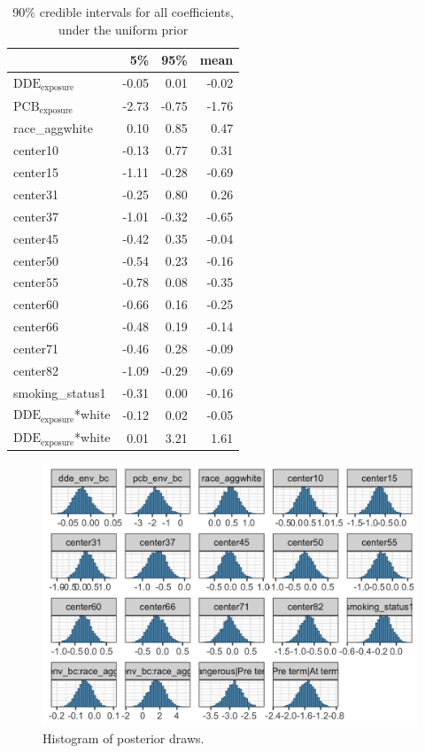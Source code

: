 \documentclass[10pt]{jmlr}%
\begin{document}
\begin{table}
	\centering
	\begin{tabular}{lrrr}
		\toprule
		 & 5\% & 95\% & mean\\
		\midrule
		$\text{DDE}_{\text{exposure}}$ & -0.05 & 0.01 & -0.02\\
		$\text{PCB}_{\text{exposure}}$ & -2.73 & -0.75 & -1.76\\
		race\_aggwhite & 0.10 & 0.85 & 0.47\\
		center10 & -0.13 & 0.77 & 0.31\\
		center15 & -1.11 & -0.28 & -0.69\\
		\addlinespace
		center31 & -0.25 & 0.80 & 0.26\\
		center37 & -1.01 & -0.32 & -0.65\\
		center45 & -0.42 & 0.35 & -0.04\\
		center50 & -0.54 & 0.23 & -0.16\\
		center55 & -0.78 & 0.08 & -0.35\\
		\addlinespace
		center60 & -0.66 & 0.16 & -0.25\\
		center66 & -0.48 & 0.19 & -0.14\\
		center71 & -0.46 & 0.28 & -0.09\\
		center82 & -1.09 & -0.29 & -0.69\\
		smoking\_status1 & -0.31 & 0.00 & -0.16\\
		\addlinespace
		$\text{DDE}_{\text{exposure}}$*white & -0.12 & 0.02 & -0.05\\
		$\text{DDE}_{\text{exposure}}$*white & 0.01 & 3.21 & 1.61\\
		\bottomrule
		\end{tabular}
	\label{tab:fullcoef}
	\caption{90\% credible intervals for all coefficients, under the uniform prior}
\end{table}

\begin{figure}
	\centering
	\includegraphics[width=\textwidth]{hists.jpeg}
	\caption{Histogram of posterior draws.}
	\label{fig:hists}
\end{figure}

%
\end{document}
